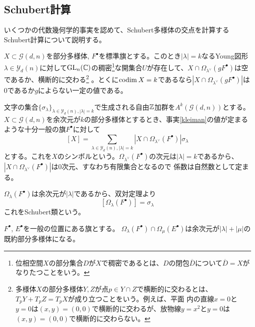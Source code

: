 \documentclass{ltjsreport}
\begin{document}
\subsection{Schubert計算}

いくつかの代数幾何学的事実を認めて、Schubert多様体の交点を計算するSchubert計算について説明する。

\begin{fact}\label{kleiman}
  $X\subset\mathcal{G}(d,n)$を部分多様体, $F^\bullet$を標準旗とする。このとき$|\lambda|=k$なるYoung図形$\lambda\in\mathcal{Y}_d(n)$に対して$\text{GL}_n(\mathbb{C})$の稠密\footnote{
    位相空間$X$の部分集合$D$が$X$で稠密であるとは、$D$の閉包$\overline{D}$について$\overline{D}=X$がなりたつことをいう。
  }な開集合$U$が存在して、$X\cap \Omega_{\lambda^\vee}(gF^\bullet)$は空であるか、横断的に交わる\footnote{
  多様体$X$の部分多様体$Y,Z$が点$p\in Y\cap Z$で横断的に交わるとは、$T_pY+T_pZ=T_pX$が成り立つことをいう。例えば、平面
  内の直線$x=0$と$y=0$は$(x,y)=(0,0)$で横断的に交わるが、放物線$y=x^2$と$y=0$は$(x,y)=(0,0)$で横断的に交わらない。
  }
  。とくに$\text{codim}\: X=k$であるなら$|X\cap \Omega_{\lambda^\vee}(gF^\bullet)|$は$0$であるか$g$によらない一定の値である。
\end{fact}

文字の集合$\{\sigma_\lambda\}_{\lambda\in\mathcal{Y}_d(n),|\lambda|=k}$で生成される自由$\mathbb{Z}$加群を$A^k(\mathcal{G}(d,n))$とする。$X\subset \mathcal{G}(d,n)$を余次元が$k$の部分多様体とするとき、事実\ref{kleiman}の値が定まるような十分一般の旗$F^\bullet$に対して
\[
[X]=\sum_{\lambda\in\mathcal{Y}_d(n),|\lambda|=k}|X\cap\Omega_{\lambda^\vee}(F^\bullet)|\sigma_\lambda  
\]
とする。これを$X$のシンボルという。$\Omega_{\lambda^\vee}(F^\bullet)$の次元は$|\lambda|=k$であるから、$|X\cap\Omega_{\lambda^\vee}(F^\bullet)|$は$0$次元、すなわち有限集合となるので
係数は自然数として定まる。

\begin{eg}
  $\Omega_{\lambda}(F^\bullet)$は余次元が$|\lambda|$であるから、双対定理より
  \[
    [\Omega_{\lambda}(F^\bullet)]=\sigma_{\lambda}
  \]
  これをSchubert類という。
\end{eg}

\begin{fact}
  $F^\bullet$, $E^\bullet$を一般の位置にある旗とする。
  $\Omega_{\lambda}(F^\bullet)\cap\Omega_{\mu}(E^\bullet)$は余次元が$|\lambda|+|\mu|$の既約部分多様体になる。
\end{fact}
\end{document}
